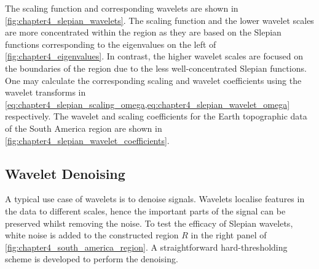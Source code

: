 The scaling function and corresponding wavelets are shown in \cref{fig:chapter4_slepian_wavelets}.
The scaling function and the lower wavelet scales are more concentrated within the region as they are based on the Slepian functions corresponding to the eigenvalues on the left of \cref{fig:chapter4_eigenvalues}.
In contrast, the higher wavelet scales are focused on the boundaries of the region due to the less well-concentrated Slepian functions.
One may calculate the corresponding scaling and wavelet coefficients using the wavelet transforms in \cref{eq:chapter4_slepian_scaling_omega,eq:chapter4_slepian_wavelet_omega} respectively.
The wavelet and scaling coefficients for the Earth topographic data of the South America region are shown in \cref{fig:chapter4_slepian_wavelet_coefficients}.





\subsection{Wavelet Denoising}\label{sec:chapter4_wavelet_denoising}

A typical use case of wavelets is to denoise signals.
Wavelets localise features in the data to different scales, hence the important parts of the signal can be preserved whilst removing the noise.
To test the efficacy of Slepian wavelets, white noise is added to the constructed region \(R\) in the right panel of \cref{fig:chapter4_south_america_region}.
A straightforward hard-thresholding scheme is developed to perform the denoising.

